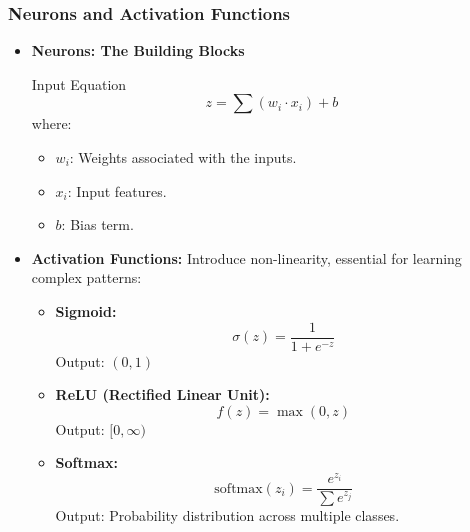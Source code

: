 \documentclass[aspectratio=169]{beamer}
\begin{document}
\begin{frame}[fragile]
    \frametitle{Neurons and Activation Functions}
    \begin{itemize}
        \item \textbf{Neurons: The Building Blocks}
            \begin{block}{Input Equation}
                \begin{equation}
                    z = \sum (w_i \cdot x_i) + b
                \end{equation}
                where:
                \begin{itemize}
                    \item $w_i$: Weights associated with the inputs.
                    \item $x_i$: Input features.
                    \item $b$: Bias term.
                \end{itemize}
            \end{block}
        \item \textbf{Activation Functions:} 
            Introduce non-linearity, essential for learning complex patterns:
            \begin{itemize}
                \item \textbf{Sigmoid:} 
                    \begin{equation} 
                        \sigma(z) = \frac{1}{1 + e^{-z}} 
                    \end{equation}
                    Output: $(0, 1)$
                \item \textbf{ReLU (Rectified Linear Unit):}
                    \begin{equation} 
                        f(z) = \max(0, z) 
                    \end{equation}
                    Output: $[0, \infty)$
                \item \textbf{Softmax:}
                    \begin{equation} 
                        \text{softmax}(z_i) = \frac{e^{z_i}}{\sum e^{z_j}} 
                    \end{equation}
                    Output: Probability distribution across multiple classes.
            \end{itemize}
    \end{itemize}
\end{frame}
\end{document}
